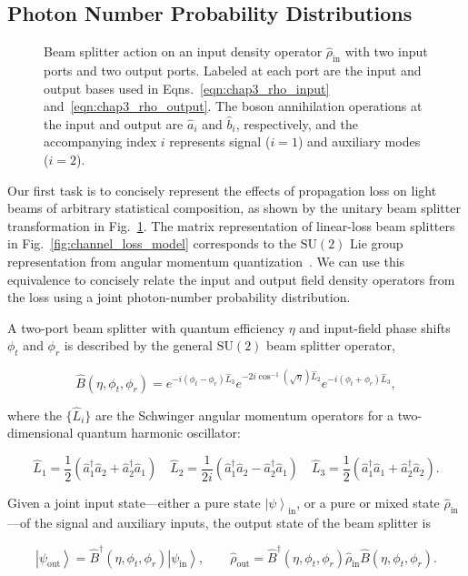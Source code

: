 \documentclass[aps,twocolumn,secnumarabic,amsmath,amssymb,pra,groupedaddress,
showpacs, showkeys]{revtex4-1}
\newcommand{\ket}[1]{\left|#1\right\rangle}
\newcommand{\pna}[1]{\left(#1\right)}
\newcommand{\eqn}[1]{
\begin{equation}
	#1
\end{equation}
}
\begin{document}
\subsection{Photon Number Probability Distributions}

\begin{figure}[tb]
	\centering
	\resizebox{3.00in}{!}{}
	\caption{Beam splitter action on an input density operator $\hat{\rho}_{\textrm{in}}$ with two input ports and two output ports. Labeled at each port are the input and output bases used in Eqns.~\ref{eqn:chap3_rho_input} and~\ref{eqn:chap3_rho_output}. The boson annihilation operations at the input and output are $\hat{a}_i$ and $\hat{b}_i$, respectively, and the accompanying index $i$ represents signal ($i=1$) and auxiliary modes ($i=2$).}
	\label{fig:beamsplitter_model}
\end{figure}

Our first task is to concisely represent the effects of propagation loss on
light beams of arbitrary statistical composition, as shown by the unitary beam
splitter transformation in Fig.~\ref{fig:beamsplitter_model}.  The matrix
representation of linear-loss beam splitters in
Fig.~\ref{fig:channel_loss_model} corresponds to the $\textrm{SU}\pna{2}$ Lie
group representation from angular momentum
quantization~\cite{PhysRevA.40.1371}. We can use this equivalence to concisely
relate the input and output field density operators from the loss using a joint
photon-number probability distribution.

A two-port beam splitter with quantum efficiency $\eta$ and input-field phase
shifts $\phi_t$ and $\phi_r$ is described by the general $\textrm{SU}\pna{2}$
beam splitter operator,
\eqn{
\hat{B}\pna{\eta,\phi_t,\phi_r}=e^{-i\pna{\phi_t-\phi_r}\hat{L}_3}e^{-2i\cos^{-1}\pna{\sqrt{\eta}}\hat{L}_2}e^{-i\pna{\phi_t+\phi_r}\hat{L}_3},\label{eq:bs_operator_def}
}
where the $\{\hat{L}_i\}$ are the Schwinger angular momentum operators for a
two-dimensional quantum harmonic oscillator:
\eqn{
\hat{L}_1 = \frac{1}{2}\pna{\hat{a}_1^{\dagger}\hat{a}_2+\hat{a}^{\dagger}_2\hat{a}_1} \quad 
\hat{L}_2 = \frac{1}{2i}\pna{\hat{a}_1^{\dagger}\hat{a}_2-\hat{a}^{\dagger}_2\hat{a}_1}\quad 
\hat{L}_3 = \frac{1}{2}\pna{\hat{a}_1^{\dagger}\hat{a}_1+\hat{a}^{\dagger}_2\hat{a}_2}.
}
Given a joint input state---either a pure state $\ket{\psi}_{\textrm{in}}$, or
a pure or mixed state $\hat{\rho}_{\textrm{in}}$---of the signal and auxiliary
inputs, the output state of the beam splitter is
\eqn{
\ket{\psi_{\textrm{out}}}=\hat{B}^{\dagger}\pna{\eta,\phi_t,\phi_r}\ket{\psi_{\textrm{in}}}, \qquad 
\hat{\rho}_{\textrm{out}}=\hat{B}^{\dagger}\pna{\eta,\phi_t,\phi_r}\hat{\rho}_{\textrm{in}}\hat{B}\pna{\eta,\phi_t,\phi_r}.\label{eq:beamsplitter_trans}}
\end{document}
